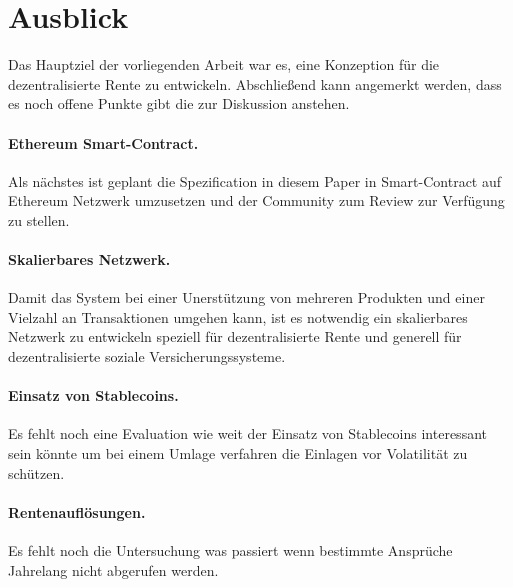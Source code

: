 \section{Ausblick}

Das Hauptziel der vorliegenden Arbeit war es, eine Konzeption für die dezentralisierte Rente zu entwickeln. Abschließend kann angemerkt werden, dass es noch offene Punkte gibt die zur Diskussion anstehen.


\paragraph{Ethereum Smart-Contract.} Als nächstes ist geplant die Spezification in diesem Paper in Smart-Contract auf Ethereum Netzwerk umzusetzen und der Community zum Review zur Verfügung zu stellen.

\paragraph{Skalierbares Netzwerk.} Damit das System bei einer Unerstützung von mehreren Produkten und einer Vielzahl an Transaktionen umgehen kann, ist es notwendig ein skalierbares Netzwerk zu entwickeln speziell für dezentralisierte Rente und generell für dezentralisierte soziale Versicherungssysteme.

\paragraph{Einsatz von Stablecoins.} Es fehlt noch eine Evaluation wie weit der Einsatz von Stablecoins interessant sein könnte um bei einem Umlage verfahren die Einlagen vor Volatilität zu schützen.

\paragraph{Rentenauflösungen.} Es fehlt noch die Untersuchung was passiert wenn bestimmte Ansprüche Jahrelang nicht abgerufen werden.

